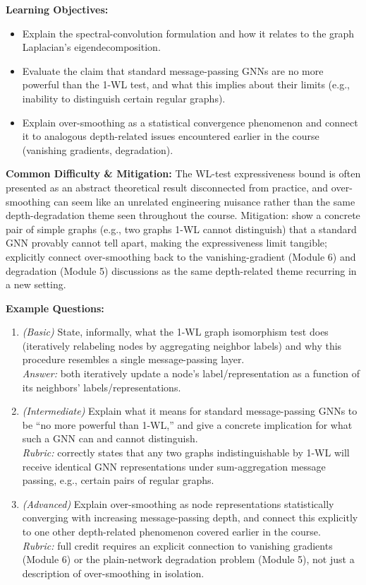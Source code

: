 \documentclass[11pt]{article}
\begin{document}
\textbf{Learning Objectives:}
\begin{itemize}
  \item Explain the spectral-convolution formulation and how it relates to the graph Laplacian's eigendecomposition.
  \item Evaluate the claim that standard message-passing GNNs are no more powerful than the 1-WL test, and what this implies about their limits (e.g., inability to distinguish certain regular graphs).
  \item Explain over-smoothing as a statistical convergence phenomenon and connect it to analogous depth-related issues encountered earlier in the course (vanishing gradients, degradation).
\end{itemize}

\textbf{Common Difficulty \& Mitigation:} The WL-test expressiveness bound is often presented as an abstract theoretical result disconnected from practice, and over-smoothing can seem like an unrelated engineering nuisance rather than the same depth-degradation theme seen throughout the course. Mitigation: show a concrete pair of simple graphs (e.g., two graphs 1-WL cannot distinguish) that a standard GNN provably cannot tell apart, making the expressiveness limit tangible; explicitly connect over-smoothing back to the vanishing-gradient (Module 6) and degradation (Module 5) discussions as the same depth-related theme recurring in a new setting.

\textbf{Example Questions:}
\begin{enumerate}
  \item \textit{(Basic)} State, informally, what the 1-WL graph isomorphism test does (iteratively relabeling nodes by aggregating neighbor labels) and why this procedure resembles a single message-passing layer. \\
  \textit{Answer:} both iteratively update a node's label/representation as a function of its neighbors' labels/representations.
  \item \textit{(Intermediate)} Explain what it means for standard message-passing GNNs to be ``no more powerful than 1-WL,'' and give a concrete implication for what such a GNN can and cannot distinguish. \\
  \textit{Rubric:} correctly states that any two graphs indistinguishable by 1-WL will receive identical GNN representations under sum-aggregation message passing, e.g., certain pairs of regular graphs.
  \item \textit{(Advanced)} Explain over-smoothing as node representations statistically converging with increasing message-passing depth, and connect this explicitly to one other depth-related phenomenon covered earlier in the course. \\
  \textit{Rubric:} full credit requires an explicit connection to vanishing gradients (Module 6) or the plain-network degradation problem (Module 5), not just a description of over-smoothing in isolation.
\end{enumerate}
\end{document}
